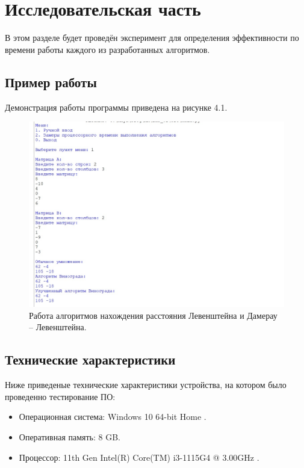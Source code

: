 \documentclass[12pt]{report}
\begin{document}
	\chapter{Исследовательская часть}
	
	В этом разделе будет проведён эксперимент для определения эффективности по времени работы каждого из разработанных алгоритмов.
	
	\section{Пример работы}
	
	Демонстрация работы программы приведена на рисунке 4.1.
	
	\begin{figure}[h]
		\begin{center}
			\includegraphics[scale=0.9]{example.jpg}
			\caption{Работа алгоритмов нахождения расстояния Левенштейна и Дамерау -- Левенштейна.}
		\end{center}
	\end{figure}
	
	\section{Технические характеристики}
	
	Ниже приведеные технические характеристики устройства, на котором было проведенно тестирование ПО:
	
	\begin{itemize}
		
		\item Операционная система: Windows 10 64-bit Home \cite{home}.
		
		\item Оперативная память: 8 GB.
		
		\item Процессор: 11th Gen Intel(R) Core(TM) i3-1115G4 @ 3.00GHz
		\cite{i3}.
		
	\end{itemize}
	
\end{document}

